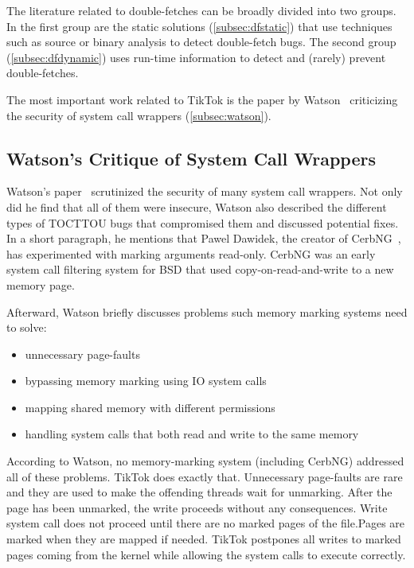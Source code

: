 \documentclass[conference]{IEEEtran}
\newcommand{\sysname}{TikTok}
\begin{document}
The literature related to double-fetches can be broadly divided into two groups.
In the first group are the static solutions (\autoref{subsec:dfstatic}) that use
techniques such as source or binary analysis to detect double-fetch bugs. The
second group (\autoref{subsec:dfdynamic}) uses run-time information to detect
and (rarely) prevent double-fetches.

The most important work related to \sysname{} is the paper by
Watson~\cite{watson2007exploiting} criticizing the security of system call
wrappers (\autoref{subsec:watson}).

\subsection{Watson's Critique of System Call Wrappers}
\label{subsec:watson}
Watson's paper~\cite{watson2007exploiting} scrutinized the security of many
system call wrappers. Not only did he find that all of them were insecure,
Watson also described the different types of TOCTTOU bugs that compromised them
and discussed potential fixes. In a short paragraph, he mentions that Pawel
Dawidek, the creator of CerbNG~\cite{zak_frasunek_dawidek}, has experimented
with marking arguments read-only. CerbNG was an early system call filtering
system for BSD that used copy-on-read-and-write to a new memory page.

Afterward, Watson briefly discusses problems such memory marking systems
need to solve: 
\begin{itemize}
    \item unnecessary page-faults
    \item bypassing memory marking using IO system calls
    \item mapping shared memory with different permissions
    \item handling system calls that both read and write to the same memory
\end{itemize}

According to Watson, no memory-marking system (including CerbNG) addressed all
of these problems. \sysname{} does exactly that. Unnecessary page-faults are
rare and they are used to make the offending threads wait for unmarking. After
the page has been unmarked, the write proceeds without any consequences. Write
system call does not proceed until there are no marked pages of the file.Pages
are marked when they are mapped if needed. \sysname{} postpones all writes to
marked pages coming from the kernel while allowing the system calls to execute
correctly.
\end{document}
